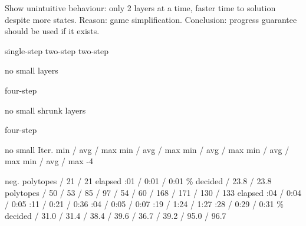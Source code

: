     Show unintuitive behaviour: only 2 layers at a time, faster time to solution despite more states.
    Reason: game simplification.
    Conclusion: progress guarantee should be used if it exists.

\stopsubsection


    \setupTABLE[frame=off,rightframe=on]
    \setupTABLE[c][first][rightframe=off]
    \setupTABLE[r][last][bottomframe=on]
    \bTABLE[align={middle,lohi}]
        \bTR[topframe=off]
            \bTH[width=0.06\textheight] \eTH
            \bTH[width=0.09\textheight] \eTH
            \bTH[width=0.17\textheight] single-step  \eTH
            \bTH[width=0.17\textheight] two-step \eTH
            \bTH[width=0.17\textheight] two-step \par no small \eTH
            \bTH[width=0.17\textheight] layers \par four-step \par no small \eTH
            \bTH[width=0.17\textheight] shrunk layers \par four-step \par no small \eTH
        \eTR
        \bTR[topframe=off]
            \bTH Iter. \eTH
            \bTH \eTH
            \bTD min / avg / max \eTD
            \bTD min / avg / max \eTD
            \bTD min / avg / max \eTD
            \bTD min / avg / max \eTD
            \bTD min / avg / max \eTD
        \eTR
        \bTR[topframe=on]
            -4 \par neg. \eTH
            \bTD polytopes \eTD
             / 21 / 21 \eTD
        \eTR
        \bTR
            \bTD elapsed \eTD
            :01 / 0:01 / 0:01 \eTD
        \eTR
        \bTR
            \bTD \% decided \eTD
             / 23.8 / 23.8 \eTD
        \eTR
        \bTR[topframe=on]
             \eTH
            \bTD polytopes \eTD
             / 50 / 53 \eTD
             / 85 / 97 \eTD
             / 54 / 60 \eTD
             / 168 / 171 \eTD
             / 130 / 133 \eTD
        \eTR
        \bTR
            \bTD elapsed \eTD
            :04 / 0:04 / 0:05 \eTD
            :11 / 0:21 / 0:36 \eTD
            :04 / 0:05 / 0:07 \eTD
            :19 / 1:24 / 1:27 \eTD
            :28 / 0:29 / 0:31 \eTD
        \eTR
        \bTR
            \bTD \% decided \eTD
             / 31.0 / 31.4 \eTD
             / 38.4 / 39.6 \eTD
             / 36.7 / 39.2 \eTD
             / 95.0 / 96.7 \eTD
